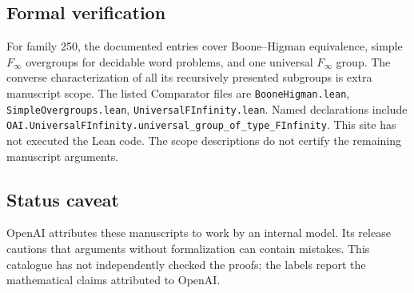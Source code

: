 \documentclass[11pt]{article}
\begin{document}
\subsection{Formal verification}
For family 250, the documented entries cover Boone--Higman equivalence, simple $F_\infty$ overgroups for decidable word problems, and one universal $F_\infty$ group. The converse characterization of all its recursively presented subgroups is extra manuscript scope. The listed Comparator files are \texttt{BooneHigman.lean}, \texttt{SimpleOvergroups.lean}, \texttt{UniversalFInfinity.lean}. Named declarations include \texttt{OAI.UniversalFInfinity.universal\_group\_of\_type\_FInfinity}. This site has not executed the Lean code. The scope descriptions do not certify the remaining manuscript arguments.

\subsection{Status caveat}
OpenAI attributes these manuscripts to work by an internal model. Its release cautions that arguments without formalization can contain mistakes. This catalogue has not independently checked the proofs; the labels report the mathematical claims attributed to OpenAI.
\end{document}

